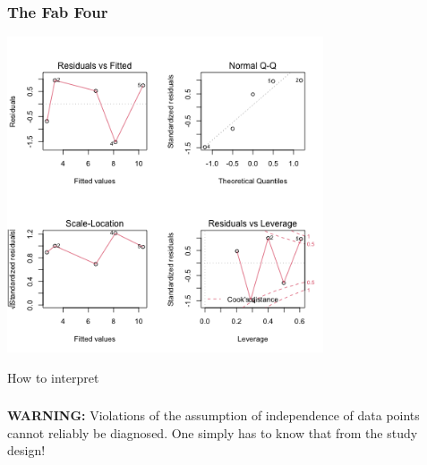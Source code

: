 \documentclass{beamer}
\begin{document}
\begin{frame}
    \frametitle{The Fab Four}
        \centering\includegraphics[width=0.7\textwidth]{lectures/day_2_LM_refresh_I/figures/unnamed-chunk-40-1.png} 
        \centering\scalebox{0.75}{
            
        }
\end{frame}

\begin{frame}
\large How to interpret 
\end{frame}

\begin{frame}
    \frametitle{}
    \textbf{WARNING:} Violations of the assumption of independence of data points cannot reliably be diagnosed. One simply has to know that from the study design!
\end{frame}
\end{document}
